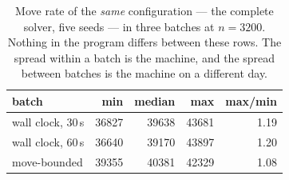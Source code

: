 \begin{table}[t]
\centering
\caption{Move rate of the \emph{same} configuration --- the complete solver, five seeds --- in three batches at $n=3200$. Nothing in the program differs between these rows. The spread within a batch is the machine, and the spread between batches is the machine on a different day.}
\label{tab:rates}
\small
\begin{tabular}{@{}lrrrr@{}}
\toprule
batch & min & median & max & max/min \\
\midrule
wall clock, 30\,s & 36827 & 39638 & 43681 & 1.19 \\
wall clock, 60\,s & 36640 & 39170 & 43897 & 1.20 \\
move-bounded & 39355 & 40381 & 42329 & 1.08 \\
\bottomrule
\end{tabular}
\end{table}
